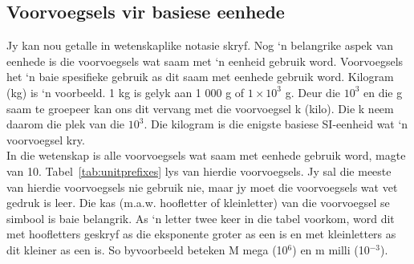 \subsection*{Voorvoegsels vir basiese eenhede}
            \nopagebreak
Jy kan nou getalle in wetenskaplike notasie skryf. Nog ‘n belangrike aspek van eenhede is die voorvoegsels wat saam met ‘n eenheid gebruik word. Voorvoegsels het ‘n baie spesifieke gebruik as dit saam met eenhede gebruik word. Kilogram (kg) is ‘n voorbeeld. 1 kg is gelyk aan 1 000 g of $1\ensuremath{\times}{10}^{3}$ g. Deur die ${10}^{3}$ en die g saam te groepeer kan ons dit vervang met die voorvoegsel k (kilo). Die k neem daarom die plek van die ${10}^{3}$. Die kilogram is die enigste basiese SI-eenheid wat ‘n voorvoegsel kry. \\
In die wetenskap is alle voorvoegsels wat saam met eenhede gebruik word, magte van 10. Tabel~\ref{tab:unitprefixes} lys van hierdie voorvoegsels. Jy sal die meeste van hierdie voorvoegsels nie gebruik nie, maar jy moet die voorvoegsels wat vet gedruk is leer. Die kas (m.a.w. hoofletter of kleinletter) van die voorvoegsel se simbool is baie belangrik. As ‘n letter twee keer in die tabel voorkom, word dit met hoofletters geskryf as die eksponente groter as een is en met kleinletters as dit kleiner as een is. So byvoorbeeld beteken M mega (10${}^{6}$) en m milli (10${}^{-3}$).


